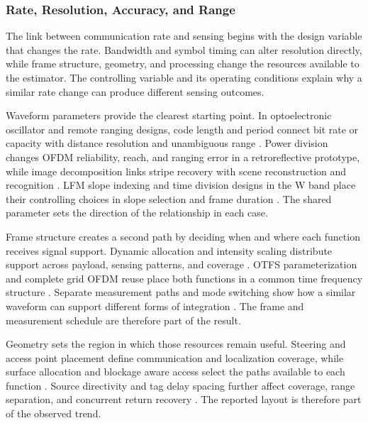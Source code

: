 \subsubsection{Rate, Resolution, Accuracy, and Range}

The link between communication rate and sensing begins with the design variable
that changes the rate. Bandwidth and symbol timing can alter resolution
directly, while frame structure, geometry, and processing change the resources
available to the estimator. The controlling variable and its operating
conditions explain why a similar rate change can produce different sensing
outcomes.

Waveform parameters provide the clearest starting point. In optoelectronic
oscillator and remote ranging designs, code length and period connect bit rate
or capacity with distance resolution and unambiguous range
\cite{OISAC_SCR00896,OISAC_SCR00576}. Power division changes OFDM reliability,
reach, and ranging error in a retroreflective prototype, while image
decomposition links stripe recovery with scene reconstruction and recognition
\cite{OISAC_SCR00912,OISAC_SCR00110}. LFM slope indexing and time division
designs in the W band place their controlling choices in slope selection and
frame duration
\cite{OISAC_SCR00361,OISAC_SCR01101}. The shared parameter sets the direction
of the relationship in each case.

Frame structure creates a second path by deciding when and where each function
receives signal support. Dynamic allocation and intensity scaling distribute
support across payload, sensing patterns, and coverage
\cite{OISAC_SCR00009,OISAC_SCR00196}. OTFS parameterization and complete grid
OFDM reuse place both functions in a common time frequency structure
\cite{OISAC_SCR00210,OISAC_SCR00274}. Separate measurement paths and mode
switching show how a similar waveform can support different forms of
integration \cite{OISAC_SCR00418,OISAC_SCR01060}. The frame and measurement
schedule are therefore part of the result.

Geometry sets the region in which those resources remain useful. Steering and
access point placement define communication and localization coverage, while
surface allocation and blockage aware access select the paths available to
each function
\cite{OISAC_SCR00036,OISAC_SCR00527,OISAC_SCR00914,OISAC_SCR01011}. Source
directivity and tag delay spacing further affect coverage, range separation,
and concurrent return recovery \cite{OISAC_SCR01024,OISAC_SCR01050}. The
reported layout is therefore part of the observed trend.

